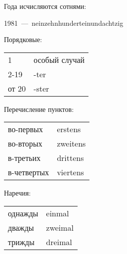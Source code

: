 Года исчисляются сотнями:

1981~---~neinzehnhunderteinundachtzig

Порядковые:

\begin{tabular}{ll}
1 & особый случай \\
2-19 & -ter \\
от 20 & -ster
\end{tabular}

Перечисление пунктов:

\begin{tabular}{ll}
во-первых & erstens \\
во-вторых & zweitens \\
в-третьих & drittens \\
в-четвертых & viertens
\end{tabular}

Наречия:

\begin{tabular}{ll}
однажды & einmal \\
дважды & zweimal \\
трижды & dreimal
\end{tabular}
